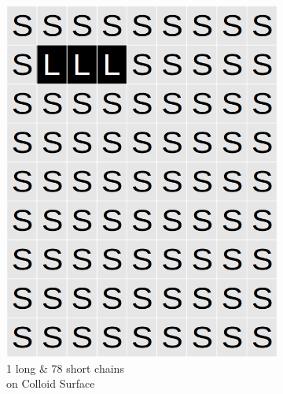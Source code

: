 \documentclass[journal=mamobx,manuscript=article]{achemso}
\begin{document}
\begin{figure}[H]
\begin{subfigure}[b]{0.4\textwidth}
        \includegraphics[scale=0.15]{fig8b.png}
        \caption{1 long \& 78 short chains\\ on Colloid Surface}
        \label{fig:B}
    \end{subfigure}
    \begin{subfigure}[b]{0.4\textwidth}

\end{subfigure}
\end{figure}
\end{document}
